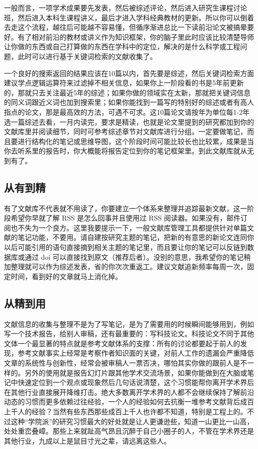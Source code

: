 \documentclass[]{book}
\begin{document}
一般而言，一项学术成果要先发表，然后被综述评论，然后进入研究生课程讨论班，然后进入本科生课程讲义，最后才进入学科经典教材的更新。所以你可以倒着去走这个流程，越往后可能越不容易懂，但循序渐进总比一下读前沿论文被搞晕要好。有了相对前沿的教材或讲义作为知识框架，你的脑子里此时应该比较清楚导师让你做的东西或自己打算做的东西在学科中的定位，解决的是什么科学或工程问题，此时可以进行基于关键词检索的文献收集了。

一个良好的搜索返回的结果应该在10篇以内，首先要是综述，然后关键词检索方面建议学点逻辑运算符来过滤掉不相关信息，如果你上一阶段看的书是5年前更新的，那就只去关注最近5年的综述；如果你做的领域实在太新，那就把关键词信息的同义词跟近义词也加到搜索里；如果你能找到一篇写的特别好的综述或者有高人指点的论文，那是最高效的方法，可遇不可求。这10篇论文请按年为单位每1-2年选一篇综述去看，一月内读完，要求是精读，也就是论文里提到的研究都加到你的文献库里并阅读细节，同时可参考综述章节对文献库进行分组。一定要做笔记，而且要进行结构化的笔记或思维导图，这个阶段时间可能比较长也比较累，成果是当你去听系里的报告时，你大概能将报告定位到你的笔记框架里。到此文献库就从无到有了。

\subsection{从有到精}

有了文献库不代表就不用读了，你要建立一个体系来整理并追踪最新文献，这一阶段希望你早就了解
RSS 是怎么回事并且使用过 RSS
阅读器。如果没有，邮件订阅也不失为一个良方。这里我要提示一下，一般文献库管理工具都提供针对单篇文献的笔记功能，不要用。请自建按研究主题的笔记，把新的有意思的新论文连同你以后可能引用的语句直接摘到相关主题的笔记里，而且要让你的笔记可以反链到数据库或通过
doi
可以直接找到原文（推荐后者）。没别的意思，我希望你的笔记稍加整理就可以作为综述发表，省的你次次重返工。建议文献追新频率每周一次，固定时间，看到好的文章就马上消化掉。

\subsection{从精到用}

文献信息的收集与整理不是为了写笔记，是为了需要用的时候瞬间能够用到，例如写一个技术报告，给别人审稿，还有最重要的：写科技论文。科技论文不同于其他文体一个最显著的特点就是参考文献体系的支撑：所有的讨论都要起于前人的发现，参考文献事实上经常是考察作者知识面的关键，对前人工作的遗漏会严重降低文章的系统性与创新性，经常会被审稿人一票否决，哪怕其实你做的跟前人是不一样的。另外的使用就是报告幻灯片跟其他学术交流场景，如果你能做到在大脑或笔记中快速定位到一个观点或现象然后几句话说清楚，这个习惯能帮你离开学术界后在其他行业直接展开降维打击。绝大多数离开学术界的人都不会继续保持了解前沿动态的习惯而更多依赖过往经验，一个人的经验如何去抗衡一堆参考文献背后成百上千人的经验？当然有些东西那些成百上千人也许都不知道，特别是工程上的。不过这种``学院派''的研究习惯最大的好处就是让人更谦逊些，知道一山更比一山高，处处重峦叠嶂。那些上来就趾高气昂且沉醉于自己小圈子的人，不管在学术界还是其他行业，九成以上是鼠目寸光之辈，请远离这些人。
\end{document}
